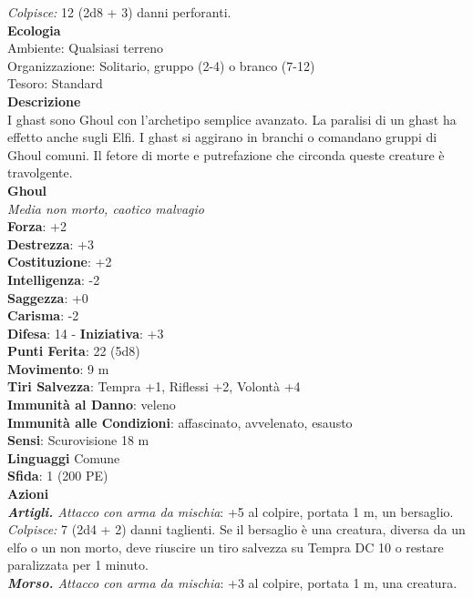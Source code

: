 \begin{multicols}{2}
\emph{Colpisce:} 12 (2d8 + 3) danni perforanti.\\
\textbf{Ecologia}\\
Ambiente: Qualsiasi terreno\\
Organizzazione: Solitario, gruppo (2-4) o branco (7-12)\\
Tesoro: Standard\\
\textbf{Descrizione}\\
I ghast sono Ghoul con l'archetipo semplice avanzato. La paralisi di un ghast ha effetto anche sugli Elfi. I ghast si aggirano in branchi o comandano gruppi di Ghoul comuni. Il fetore di morte e putrefazione che circonda queste creature è travolgente.\\


\medskip\textbf{Ghoul}\\
\emph{Media non morto, caotico malvagio}\\
\textbf{Forza}: +2\\
\textbf{Destrezza}: +3\\
\textbf{Costituzione}: +2\\
\textbf{Intelligenza}: -2\\
\textbf{Saggezza}: +0\\
\textbf{Carisma}: -2\\
\textbf{Difesa}: 14 - \textbf{Iniziativa}: +3\\
\textbf{Punti Ferita}: 22 (5d8)\\
\textbf{Movimento}: 9 m\\
\textbf{Tiri Salvezza}: Tempra +1, Riflessi +2, Volontà +4\\
\textbf{Immunità al Danno}: veleno\\
\textbf{Immunità alle Condizioni}: affascinato, avvelenato, esausto\\
\textbf{Sensi}: Scurovisione 18 m\\
\textbf{Linguaggi} Comune\\
\textbf{Sfida}: 1 (200 PE)\smallskip\\
\smallskip\textbf{Azioni}\\
\emph{\textbf{Artigli.} Attacco con arma da mischia}: +5 al colpire, portata 1 m, un bersaglio.\\
\emph{Colpisce:} 7 (2d4 + 2) danni taglienti. Se il bersaglio è una creatura, diversa da un elfo o un non morto, deve riuscire un tiro salvezza su Tempra DC 10 o restare paralizzata per 1 minuto.\\
\emph{\textbf{Morso.} Attacco con arma da mischia}: +3 al colpire, portata 1 m, una creatura.\\

\end{multicols}
